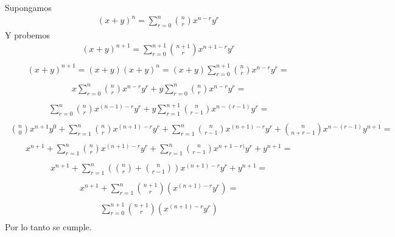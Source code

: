 \documentclass{article}
\begin{document}
\begin{enumerate}
    Supongamos 
    \begin{gather*}  
        (x+y)^n =   \sum_{r=0}^{n} \binom{n}{r} x^{n-r}y^{r}
    \end{gather*}
    Y probemos
    \begin{gather*}
        (x+y)^{n+1} = \sum_{r=0}^{n+1} \binom{n+1}{r} x^{n+1-r}y^{r}\\\
    \end{gather*}    
    \begin{gather*}
        (x+y)^{n+1} = (x+y)(x+y)^n = (x+y) \sum_{r=0}^{n+1} \binom{n}{r} x^{n-r}y^{r}=\\\
    \end{gather*}
    \begin{gather*}
        \ x \sum_{r=0}^{n} \binom{n}{r} x^{n-r}y^{r} +  y \sum_{r=0}^{n} \binom{n}{r} x^{n-r}y^{r}=\\\
    \end{gather*}
    \begin{gather*}
         \  \sum_{r=0}^{n} \binom{n}{r} x^{(n-1)-r}y^{r} +  y \sum_{r=1}^{n+1} \binom{n}{r-1} x^{n-(r-1)}y^{r}=\\\
    \end{gather*}
    \begin{gather*}
         \  \binom{n}{0} x^{n+1}y^{0} + \sum_{r=1}^{n} \binom{n}{r} x^{(n+1)-r}y^{r} + \sum_{r=1}^{n} \binom{n}{r-1} x^{(n+1)-r}y^{r} + \binom{n}{n+r-1} x^{n-(r-1)}y^{n+1}=\\\
    \end{gather*}
    \begin{gather*}
         \  x^{n+1} + \sum_{r=1}^{n} \binom{n}{r} x^{(n+1)-r}y^{r} +   \sum_{r=1}^{n} \binom{n}{r-1} x^{n+1-r)}y^{r} + y^{n+1}=\\\
    \end{gather*}
    \begin{gather*}
         \  x^{n+1} + \sum_{r=1}^{n} (\binom{n}{r} + \binom{n}{r-1}) x^{(n+1)-r}y^{r} +  y^{n+1}  =\\\
    \end{gather*}
    \begin{gather*}
         \  x^{n+1} + \sum_{r=1}^{n} \binom{n+1}{r} (x^{(n+1)-r} y^r) =\\\
    \end{gather*}
    \begin{gather*}
         \   \sum_{r=0}^{n+1} \binom{n+1}{r} (x^{(n+1)-r} y^r) \\\
    \end{gather*}
    Por lo tanto se cumple.\\
    

\end{enumerate}
\end{document}
